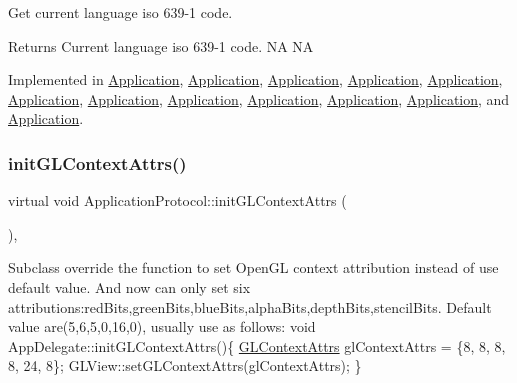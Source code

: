 Get current language iso 639-\/1 code. 

\begin{DoxyReturn}{Returns}
Current language iso 639-\/1 code.  NA  NA 
\end{DoxyReturn}


Implemented in \hyperlink{classApplication_a47bfc4cd5a784ce46bd05e727b2e8781}{Application}, \hyperlink{classApplication_a47bfc4cd5a784ce46bd05e727b2e8781}{Application}, \hyperlink{classApplication_a47bfc4cd5a784ce46bd05e727b2e8781}{Application}, \hyperlink{classApplication_a47bfc4cd5a784ce46bd05e727b2e8781}{Application}, \hyperlink{classApplication_a47bfc4cd5a784ce46bd05e727b2e8781}{Application}, \hyperlink{classApplication_a47bfc4cd5a784ce46bd05e727b2e8781}{Application}, \hyperlink{classApplication_a8b381edef7fa6ce48092073c6d843c4b}{Application}, \hyperlink{classApplication_a47bfc4cd5a784ce46bd05e727b2e8781}{Application}, \hyperlink{classApplication_aed89715279c32959c41ec88fa65018a7}{Application}, \hyperlink{classApplication_aa110b9387e32148fec4bf913250bbac2}{Application}, \hyperlink{classApplication_aed89715279c32959c41ec88fa65018a7}{Application}, and \hyperlink{classApplication_aed89715279c32959c41ec88fa65018a7}{Application}.

\mbox{\label{classApplicationProtocol_a4b83bcd1a065b1d745cbc3f358c45878}} 
\subsubsection{\texorpdfstring{init\+G\+L\+Context\+Attrs()}{initGLContextAttrs()}\hspace{0.1cm}{\footnotesize\ttfamily [1/2]}}
{\footnotesize\ttfamily virtual void Application\+Protocol\+::init\+G\+L\+Context\+Attrs (\begin{DoxyParamCaption}{ }\end{DoxyParamCaption})\hspace{0.3cm}{\ttfamily [inline]}, {\ttfamily [virtual]}}

Subclass override the function to set Open\+GL context attribution instead of use default value. And now can only set six attributions\+:red\+Bits,green\+Bits,blue\+Bits,alpha\+Bits,depth\+Bits,stencil\+Bits. Default value are(5,6,5,0,16,0), usually use as follows\+: void App\+Delegate\+::init\+G\+L\+Context\+Attrs()\{ \hyperlink{structGLContextAttrs}{G\+L\+Context\+Attrs} gl\+Context\+Attrs = \{8, 8, 8, 8, 24, 8\}; G\+L\+View\+::set\+G\+L\+Context\+Attrs(gl\+Context\+Attrs); \} \mbox{\label{classApplicationProtocol_a4b83bcd1a065b1d745cbc3f358c45878}} 
